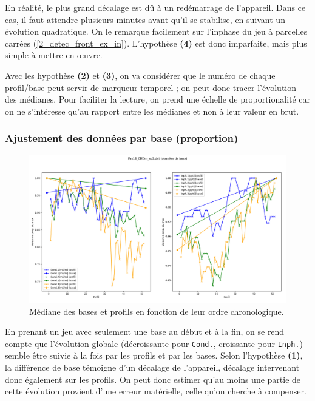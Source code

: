 \documentclass[12pt]{article}
\begin{document}
    En réalité, le plus grand décalage est dû à un redémarrage de l'appareil. Dans ce cas, il faut attendre plusieurs minutes avant qu'il se stabilise, en suivant un évolution quadratique. On le remarque facilement sur l'inphase du jeu à parcelles carrées (\ref{2_detec_front_ex_in}). L'hypothèse \textbf{(4)} est donc imparfaite, mais plus simple à mettre en œuvre.

    Avec les hypothèse \textbf{(2)} et \textbf{(3)}, on va considérer que le numéro de chaque profil/base peut servir de marqueur temporel ; on peut donc tracer l'évolution des médianes. Pour faciliter la lecture, on prend une échelle de proportionalité car on ne s'intéresse qu'au rapport entre les médianes et non à leur valeur en brut.

\subsubsection{Ajustement des données par base (proportion)}

    \begin{figure}[ht!]
        \centering
        \includegraphics[width=\textwidth]{Images/Base_Avant_sq2.png}  
        \caption{Médiane des bases et profils en fonction de leur ordre chronologique.}
    \end{figure}

    En prenant un jeu avec seulement une base au début et à la fin, on se rend compte que l'évolution globale (décroissante pour \texttt{Cond.}, croissante pour \texttt{Inph.}) semble être suivie à la fois par les profils et par les bases. Selon l'hypothèse \textbf{(1)}, la différence de base témoigne d'un décalage de l'appareil, décalage intervenant donc également sur les profils. On peut donc estimer qu'au moins une partie de cette évolution provient d'une erreur matérielle, celle qu'on cherche à compenser.
\end{document}
